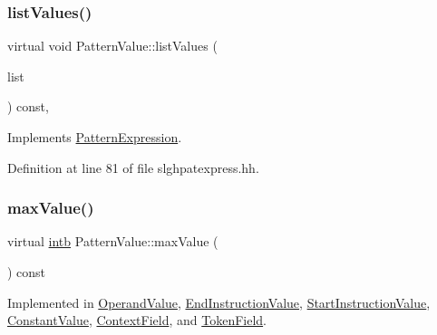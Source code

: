 \subsubsection{\texorpdfstring{listValues()}{listValues()}}
{\footnotesize\ttfamily virtual void Pattern\+Value\+::list\+Values (\begin{DoxyParamCaption}\item[{vector$<$ const \mbox{\hyperlink{class_pattern_value}{Pattern\+Value}} $\ast$ $>$ \&}]{list }\end{DoxyParamCaption}) const\hspace{0.3cm}{\ttfamily [inline]}, {\ttfamily [virtual]}}



Implements \mbox{\hyperlink{class_pattern_expression_a48d1a8fce687ba5c272b2e0d72760363}{Pattern\+Expression}}.



Definition at line 81 of file slghpatexpress.\+hh.

\mbox{\label{class_pattern_value_a865e8f34e031ef31f77dcaa93d76820d}} 
\subsubsection{\texorpdfstring{maxValue()}{maxValue()}}
{\footnotesize\ttfamily virtual \mbox{\hyperlink{types_8h_aa925ba3e627c2df89d5b1cfe84fb8572}{intb}} Pattern\+Value\+::max\+Value (\begin{DoxyParamCaption}\item[{void}]{ }\end{DoxyParamCaption}) const\hspace{0.3cm}{\ttfamily [pure virtual]}}



Implemented in \mbox{\hyperlink{class_operand_value_af085d3749d762be4f5e30339c063a009}{Operand\+Value}}, \mbox{\hyperlink{class_end_instruction_value_af6230d95fcb68cfbcf0522e74df0232c}{End\+Instruction\+Value}}, \mbox{\hyperlink{class_start_instruction_value_a87c142a7b212a8b68e7ca1f9ad3f9ede}{Start\+Instruction\+Value}}, \mbox{\hyperlink{class_constant_value_aa212eac1ed40169d08155c7fd83224e2}{Constant\+Value}}, \mbox{\hyperlink{class_context_field_aa72fece0728c113a1218bb0c756e0a1d}{Context\+Field}}, and \mbox{\hyperlink{class_token_field_ad42951c882a6013b44a7632fc60ae5d6}{Token\+Field}}.


